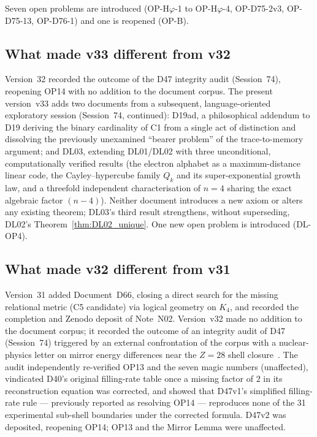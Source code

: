 \documentclass[11pt,a4paper]{article}
\theoremstyle{plain}
\theoremstyle{definition}
\theoremstyle{remark}
\begin{document}
Seven open problems are introduced (OP-H$\varphi$-1 to OP-H$\varphi$-4, OP-D75-2v3, OP-D75-13, OP-D76-1) and one is reopened (OP-B).

\subsection{What made v33 different from v32}
\label{subsec:diffv32}
Version~32 recorded the outcome of the D47 integrity audit (Session~74), reopening OP14 with no addition to the document corpus. The present version~v33 adds two documents from a subsequent, language-oriented exploratory session (Session~74, continued): D19ad, a philosophical addendum to D19 deriving the binary cardinality of C1 from a single act of distinction and dissolving the previously unexamined ``bearer problem'' of the trace-to-memory argument; and DL03, extending DL01/DL02 with three unconditional, computationally verified results (the electron alphabet as a maximum-distance linear code, the Cayley--hypercube family $Q_k$ and its super-exponential growth law, and a threefold independent characterisation of $n=4$ sharing the exact algebraic factor $(n-4)$). Neither document introduces a new axiom or alters any existing theorem; DL03's third result strengthens, without superseding, DL02's Theorem~\ref{thm:DL02_unique}. One new open problem is introduced (DL-OP4).

\subsection{What made v32 different from v31}
\label{subsec:diffv31}
Version~31 added Document~D66, closing a direct search for the missing relational metric (C5 candidate) via logical geometry on $K_4$, and recorded the completion and Zenodo deposit of Note~N02. Version~v32 made no addition to the document corpus; it recorded the outcome of an integrity audit of D47 (Session~74) triggered by an external confrontation of the corpus with a nuclear-physics letter on mirror energy differences near the $Z=28$ shell closure~\cite{Pigliapoco2026}. The audit independently re-verified OP13 and the seven magic numbers (unaffected), vindicated D40's original filling-rate table once a missing factor of $2$ in its reconstruction equation was corrected, and showed that D47v1's simplified filling-rate rule --- previously reported as resolving OP14 --- reproduces none of the 31 experimental sub-shell boundaries under the corrected formula. D47v2 was deposited, reopening OP14; OP13 and the Mirror Lemma were unaffected.
\end{document}
